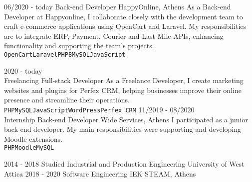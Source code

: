 \documentclass[10pt]{developercv}
\begin{document}


\begin{entrylist}
	\entry
		{06/2020 - today}
		{Back-end Developer}
		{HappyOnline, Athens}
		{As a Back-end Developer at Happyonline, I collaborate closely with the development team to craft e-commerce applications using OpenCart and Laravel. My responsibilities are to integrate ERP, Payment, Courier and Last Mile APIs, enhancing functionality and supporting the team's projects.\\ \texttt{OpenCart}\slashsep\texttt{Laravel}\slashsep\texttt{PHP8}\slashsep\texttt{MySQL}\slashsep\texttt{JavaScript}}
	
	\entry
		{2020 - today\\\footnotesize{Freelancing}}
		{Full-stack Developer}
		{}
		{As a Freelance Developer, I create marketing websites and plugins for Perfex CRM, helping businesses improve their online presence and streamline their operations.\\ \texttt{PHP}\slashsep\texttt{MySQL}\slashsep\texttt{JavaScript}\slashsep\texttt{WordPress}\slashsep\texttt{Perfex CRM}}
	\entry
		{11/2019 - 08/2020\\\footnotesize{Internship}}
		{Back-end Developer}
		{Wide Services, Athens}
		{I participated as a junior back-end developer. My main responsibilities were supporting and developing Moodle extensions.\\ \texttt{PHP}\slashsep\texttt{Moodle}\slashsep\texttt{MySQL}}
\end{entrylist}



\begin{entrylist}
	\entry
		{2014 - 2018}
		{Studied Industrial and Production Engineering}
		{University of West Attica}
		{}
	\entry 
		{2018 - 2020}
		{Software Engineering}
		{ΙΕΚ STEAM, Athens}
		{}
\end{entrylist}

\end{document}
